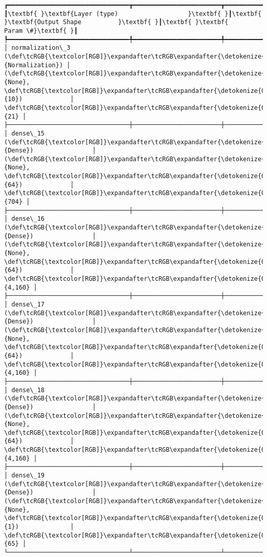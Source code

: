 \documentclass[11pt]{article}
\begin{document}
    \begin{Verbatim}[commandchars=\\\{\}]
┏━━━━━━━━━━━━━━━━━━━━━━━━━━━━━━━━━┳━━━━━━━━━━━━━━━━━━━━━━━━┳━━━━━━━━━━━━━━━┓
┃\textbf{ }\textbf{Layer (type)                   }\textbf{ }┃\textbf{ }\textbf{Output Shape          }\textbf{ }┃\textbf{ }\textbf{      Param \#}\textbf{ }┃
┡━━━━━━━━━━━━━━━━━━━━━━━━━━━━━━━━━╇━━━━━━━━━━━━━━━━━━━━━━━━╇━━━━━━━━━━━━━━━┩
│ normalization\_3 (\def\tcRGB{\textcolor[RGB]}\expandafter\tcRGB\expandafter{\detokenize{0,135,255}}{Normalization}) │ (\def\tcRGB{\textcolor[RGB]}\expandafter\tcRGB\expandafter{\detokenize{0,215,255}}{None}, \def\tcRGB{\textcolor[RGB]}\expandafter\tcRGB\expandafter{\detokenize{0,175,0}}{10})             │            \def\tcRGB{\textcolor[RGB]}\expandafter\tcRGB\expandafter{\detokenize{0,175,0}}{21} │
├─────────────────────────────────┼────────────────────────┼───────────────┤
│ dense\_15 (\def\tcRGB{\textcolor[RGB]}\expandafter\tcRGB\expandafter{\detokenize{0,135,255}}{Dense})                │ (\def\tcRGB{\textcolor[RGB]}\expandafter\tcRGB\expandafter{\detokenize{0,215,255}}{None}, \def\tcRGB{\textcolor[RGB]}\expandafter\tcRGB\expandafter{\detokenize{0,175,0}}{64})             │           \def\tcRGB{\textcolor[RGB]}\expandafter\tcRGB\expandafter{\detokenize{0,175,0}}{704} │
├─────────────────────────────────┼────────────────────────┼───────────────┤
│ dense\_16 (\def\tcRGB{\textcolor[RGB]}\expandafter\tcRGB\expandafter{\detokenize{0,135,255}}{Dense})                │ (\def\tcRGB{\textcolor[RGB]}\expandafter\tcRGB\expandafter{\detokenize{0,215,255}}{None}, \def\tcRGB{\textcolor[RGB]}\expandafter\tcRGB\expandafter{\detokenize{0,175,0}}{64})             │         \def\tcRGB{\textcolor[RGB]}\expandafter\tcRGB\expandafter{\detokenize{0,175,0}}{4,160} │
├─────────────────────────────────┼────────────────────────┼───────────────┤
│ dense\_17 (\def\tcRGB{\textcolor[RGB]}\expandafter\tcRGB\expandafter{\detokenize{0,135,255}}{Dense})                │ (\def\tcRGB{\textcolor[RGB]}\expandafter\tcRGB\expandafter{\detokenize{0,215,255}}{None}, \def\tcRGB{\textcolor[RGB]}\expandafter\tcRGB\expandafter{\detokenize{0,175,0}}{64})             │         \def\tcRGB{\textcolor[RGB]}\expandafter\tcRGB\expandafter{\detokenize{0,175,0}}{4,160} │
├─────────────────────────────────┼────────────────────────┼───────────────┤
│ dense\_18 (\def\tcRGB{\textcolor[RGB]}\expandafter\tcRGB\expandafter{\detokenize{0,135,255}}{Dense})                │ (\def\tcRGB{\textcolor[RGB]}\expandafter\tcRGB\expandafter{\detokenize{0,215,255}}{None}, \def\tcRGB{\textcolor[RGB]}\expandafter\tcRGB\expandafter{\detokenize{0,175,0}}{64})             │         \def\tcRGB{\textcolor[RGB]}\expandafter\tcRGB\expandafter{\detokenize{0,175,0}}{4,160} │
├─────────────────────────────────┼────────────────────────┼───────────────┤
│ dense\_19 (\def\tcRGB{\textcolor[RGB]}\expandafter\tcRGB\expandafter{\detokenize{0,135,255}}{Dense})                │ (\def\tcRGB{\textcolor[RGB]}\expandafter\tcRGB\expandafter{\detokenize{0,215,255}}{None}, \def\tcRGB{\textcolor[RGB]}\expandafter\tcRGB\expandafter{\detokenize{0,175,0}}{1})              │            \def\tcRGB{\textcolor[RGB]}\expandafter\tcRGB\expandafter{\detokenize{0,175,0}}{65} │
└─────────────────────────────────┴────────────────────────┴───────────────┘


\end{Verbatim}
\end{document}
